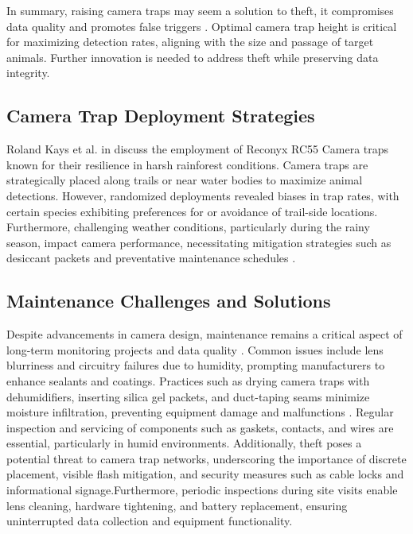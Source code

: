 \documentclass[class=report,11pt,crop=false]{standalone}
\begin{document}
In summary, raising camera traps may seem a solution to theft, it compromises data quality and promotes false triggers \cite{meek2016higher}. Optimal camera trap height is critical for maximizing detection rates, aligning with the size and passage of target animals. Further innovation is needed to address theft while preserving data integrity. 

 

\subsection{Camera Trap Deployment Strategies}

Roland Kays et al. in \cite{monitoring2015} discuss the employment of Reconyx RC55 Camera traps known for their resilience in harsh rainforest conditions. Camera traps are strategically placed along trails or near water bodies to maximize animal detections. However, randomized deployments revealed biases in trap rates, with certain species exhibiting preferences for or avoidance of trail-side locations. Furthermore, challenging weather conditions, particularly during the rainy season, impact camera performance, necessitating mitigation strategies such as desiccant packets and preventative maintenance schedules \cite{monitoring2015}.

 

\subsection{Maintenance Challenges and Solutions}

Despite advancements in camera design, maintenance remains a critical aspect of long-term monitoring projects and data quality \cite{monitoring2015}. Common issues include lens blurriness and circuitry failures due to humidity, prompting manufacturers to enhance sealants and coatings. Practices such as drying camera traps with dehumidifiers, inserting silica gel packets, and duct-taping seams minimize moisture infiltration, preventing equipment damage and malfunctions \cite{glover2019camera}.  Regular inspection and servicing of components such as gaskets, contacts, and wires are essential, particularly in humid environments. Additionally, theft poses a potential threat to camera trap networks, underscoring the importance of discrete placement, visible flash mitigation, and security measures such as cable locks and informational signage.Furthermore, periodic inspections during site visits enable lens cleaning, hardware tightening, and battery replacement, ensuring uninterrupted data collection and equipment functionality. 
\end{document}
